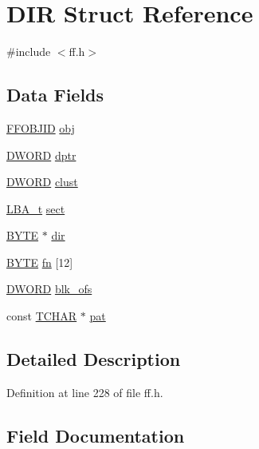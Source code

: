 \hypertarget{structDIR}{}\section{D\+IR Struct Reference}
\label{structDIR}


{\ttfamily \#include $<$ff.\+h$>$}

\subsection*{Data Fields}
\begin{DoxyCompactItemize}
\item 
\hyperlink{structFFOBJID}{F\+F\+O\+B\+J\+ID} \hyperlink{structDIR_a8fa2dfd8198410ea92a98281d982cf44}{obj}
\item 
\hyperlink{ff_8h_ad342ac907eb044443153a22f964bf0af}{D\+W\+O\+RD} \hyperlink{structDIR_a0330e9554e1f38795debe4495156873e}{dptr}
\item 
\hyperlink{ff_8h_ad342ac907eb044443153a22f964bf0af}{D\+W\+O\+RD} \hyperlink{structDIR_acfbb8ba2d6e73b6f999ceffd1857c190}{clust}
\item 
\hyperlink{ff_8h_a1f3c30a83148a28340f009d4e583f087}{L\+B\+A\+\_\+t} \hyperlink{structDIR_ae76119034beae8f34eb1536d0ef83a40}{sect}
\item 
\hyperlink{ff_8h_a4ae1dab0fb4b072a66584546209e7d58}{B\+Y\+TE} $\ast$ \hyperlink{structDIR_a6c2a8c0cf2d55ae99775e93a16593449}{dir}
\item 
\hyperlink{ff_8h_a4ae1dab0fb4b072a66584546209e7d58}{B\+Y\+TE} \hyperlink{structDIR_ad90d974c0e7640307598c586bf141b32}{fn} \mbox{[}12\mbox{]}
\item 
\hyperlink{ff_8h_ad342ac907eb044443153a22f964bf0af}{D\+W\+O\+RD} \hyperlink{structDIR_afdb5d6302a88eaf5d43da0352ca2cc91}{blk\+\_\+ofs}
\item 
const \hyperlink{ff_8h_a03bdb8ce5895c7e261aadc2529637546}{T\+C\+H\+AR} $\ast$ \hyperlink{structDIR_a1f636884096de91deb97f59209d60e96}{pat}
\end{DoxyCompactItemize}


\subsection{Detailed Description}


Definition at line 228 of file ff.\+h.



\subsection{Field Documentation}
\mbox{\label{structDIR_afdb5d6302a88eaf5d43da0352ca2cc91}} 
